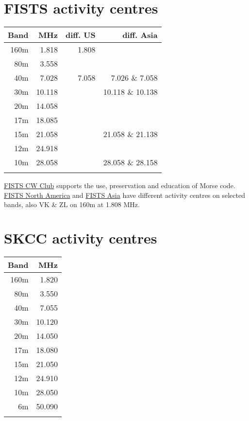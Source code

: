 \documentclass[10pt]{article}
\begin{document}
\begin{multicols}{3}
\section{FISTS activity centres}
\vspace{\baselineskip}
\begin{tabular}{rrrr}
Band & MHz & diff. US & diff. Asia \\ \hline 
160m & 1.818 & 1.808 & \\ 
 80m & 3.558 &  &\\ 
 40m & 7.028 & 7.058 & 7.026 \& 7.058 \\
 30m & 10.118 & & 10.118 \& 10.138 \\ 
 20m & 14.058 & & \\ 
 17m & 18.085 & & \\ 
 15m & 21.058 & & 21.058 \& 21.138 \\ 
 12m & 24.918 & & \\ 
 10m & 28.058 & & 28.058 \& 28.158 \\
     &        & & \\     
\end{tabular}

\href{https://fists.co.uk}{FISTS CW Club} supports the use, preservation and education of Morse code. \href{http://fistsna.org}{FISTS North America} and \href{http://www.feacw.net}{FISTS Asia} have different activity centres on selected bands, also VK \& ZL on 160m at 1.808 MHz. \\

\section{SKCC activity centres}
\vspace{\baselineskip}
\begin{tabular}{rr}
Band & MHz\\ \hline 
160m & 1.820\\
 80m & 3.550\\
 40m & 7.055\\
 30m & 10.120\\
 20m & 14.050\\
 17m & 18.080\\
 15m & 21.050\\
 12m & 24.910\\
 10m & 28.050\\
  6m & 50.090\\
     &       \\
\end{tabular}


\end{multicols}
\end{document}
